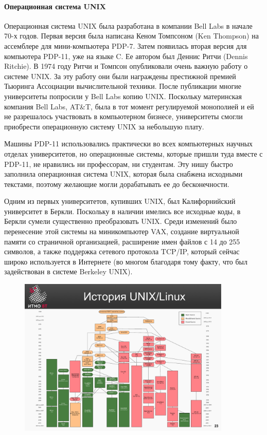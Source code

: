 \documentclass[10pt]{article}
\begin{document}
	\paragraph{Операционная система UNIX}
	Операционная система UNIX была разработана в компании Bell Labs в начале 70-х годов. Первая версия была написана Кеном Томпсоном (Ken Thompson) на ассемблере для мини-компьютера PDP-7. Затем появилась вторая версия для компьютера PDP-11, уже на языке C. Ее автором был Деннис Ритчи (Dennis Ritchie). В 1974 году Ритчи и Томпсон опубликовали очень важную работу о системе UNIX. За эту работу они были награждены престижной премией Тьюринга Ассоциации вычислительной техники. После публикации многие университеты попросили у Bell Labs копию UNIX. Поскольку материнская компания Bell Labs, AT\&T, была в тот момент регулируемой монополией и ей не разрешалось участвовать в компьютерном бизнесе, университеты смогли приобрести операционную систему UNIX за небольшую плату.

	Машины PDP-11 использовались практически во всех компьютерных научных отделах университетов, но операционные системы, которые  пришли туда вместе с PDP-11, не нравились ни профессорам, ни студентам. Эту нишу быстро заполнила операционная система UNIX, которая была снабжена исходными текстами, поэтому желающие могли дорабатывать ее до бесконечности.

	Одним из первых университетов, купивших UNIX, был Калифорнийский университет в Беркли. Поскольку в наличии имелись все исходные коды, в Беркли сумели существенно преобразовать UNIX. Среди изменений было перенесение этой системы на миникомпьютер VAX, создание виртуальной памяти со страничной организацией, расширение имен файлов с 14 до 255 символов, а также поддержка сетевого протокола TCP/IP, который сейчас широко используется в  Интернете (во многом благодаря тому факту, что был задействован в системе Berkeley UNIX).

	\begin{figure}[ht!]
		\centering
		\includegraphics[width=0.9\textwidth]{assets/pages/nix_history.pdf}
	\end{figure}
\end{document}
